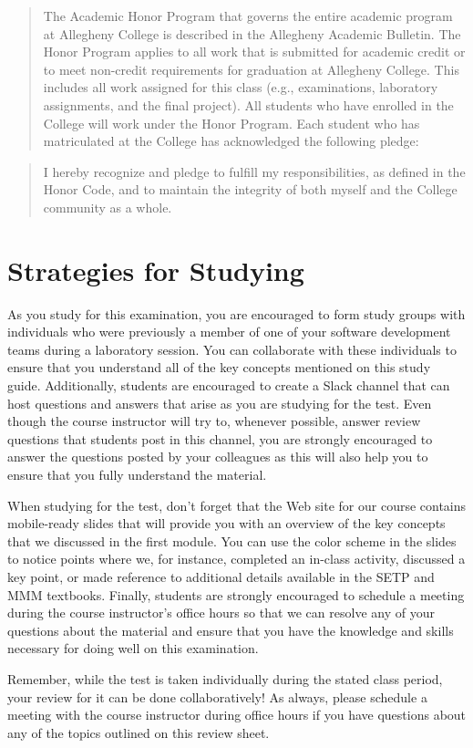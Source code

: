 \documentclass[11pt]{article}
\begin{document}
\begin{quote}

  The Academic Honor Program that governs the entire academic program at
  Allegheny College is described in the Allegheny Academic Bulletin. The Honor
  Program applies to all work that is submitted for academic credit or to meet
  non-credit requirements for graduation at Allegheny College. This includes all
  work assigned for this class (e.g., examinations, laboratory assignments, and
  the final project). All students who have enrolled in the College will work
  under the Honor Program. Each student who has matriculated at the College has
  acknowledged the following pledge:

\end{quote}

\begin{quote}

  I hereby recognize and pledge to fulfill my responsibilities, as defined in
  the Honor Code, and to maintain the integrity of both myself and the College
  community as a whole.

\end{quote}

\section*{Strategies for Studying}

As you study for this examination, you are encouraged to form study groups with
individuals who were previously a member of one of your software development
teams during a laboratory session. You can collaborate with these individuals to
ensure that you understand all of the key concepts mentioned on this study
guide. Additionally, students are encouraged to create a Slack channel that can
host questions and answers that arise as you are studying for the test. Even
though the course instructor will try to, whenever possible, answer review
questions that students post in this channel, you are strongly encouraged to
answer the questions posted by your colleagues as this will also help you to
ensure that you fully understand the material.

When studying for the test, don't forget that the Web site for our course
contains mobile-ready slides that will provide you with an overview of the key
concepts that we discussed in the first module. You can use the color scheme in
the slides to notice points where we, for instance, completed an in-class
activity, discussed a key point, or made reference to additional details
available in the SETP and MMM textbooks. Finally, students are strongly
encouraged to schedule a meeting during the course instructor's office hours so
that we can resolve any of your questions about the material and ensure that you
have the knowledge and skills necessary for doing well on this examination.

Remember, while the test is taken individually during the stated class period,
your review for it can be done collaboratively! As always, please schedule a
meeting with the course instructor during office hours if you have questions
about any of the topics outlined on this review sheet.
\end{document}
